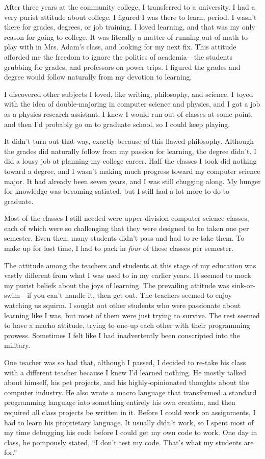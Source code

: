 After three years at the community college, I transferred to a university. I had a very purist attitude about college. I figured I was there to learn, period. I wasn't there for grades, degrees, or job training. I loved learning, and that was my only reason for going to college. It was literally a matter of running out of math to play with in Mrs. Adam's class, and looking for my next fix. This attitude afforded me the freedom to ignore the politics of academia---the students grubbing for grades, and professors on power trips. I figured the grades and degree would follow naturally from my devotion to learning.

I discovered other subjects I loved, like writing, philosophy, and science. I toyed with the idea of double-majoring in computer science and physics, and I got a job as a physics research assistant. I knew I would run out of classes at some point, and then I'd probably go on to graduate school, so I could keep playing.

It didn't turn out that way, exactly because of this flawed philosophy. Although the grades did naturally follow from my passion for learning, the degree didn't. I did a lousy job at planning my college career. Half the classes I took did nothing toward a degree, and I wasn't making much progress toward my computer science major. It had already been seven years, and I was still chugging along. My hunger for knowledge was becoming satiated, but I still had a lot more to do to graduate.

Most of the classes I still needed were upper-division computer science classes, each of which were so challenging that they were designed to be taken one per semester. Even then, many students didn't pass and had to re-take them. To make up for lost time, I had to pack in \emph{four} of these classes per semester. 

The attitude among the teachers and students at this stage of my education was vastly different from what I was used to in my earlier years. It seemed to mock my purist beliefs about the joys of learning. The prevailing attitude was sink-or-swim---if you can't handle it, then get out. The teachers seemed to enjoy watching us squirm. I sought out other students who were passionate about learning like I was, but most of them were just trying to survive. The rest seemed to have a macho attitude, trying to one-up each other with their programming prowess. Sometimes I felt like I had inadvertently been conscripted into the military.

One teacher was so bad that, although I passed, I decided to re-take his class with a different teacher because I knew I'd learned nothing. He mostly talked about himself, his pet projects, and his highly-opinionated thoughts about the computer industry. He also wrote a macro language that transformed a standard programming language into something entirely his own creation, and then required all class projects be written in it. Before I could work on assignments, I had to learn his proprietary language. It usually didn't work, so I spent most of my time debugging his code before I could get my own code to work. One day in class, he pompously stated, ``I don't test my code. That's what my students are for.''

